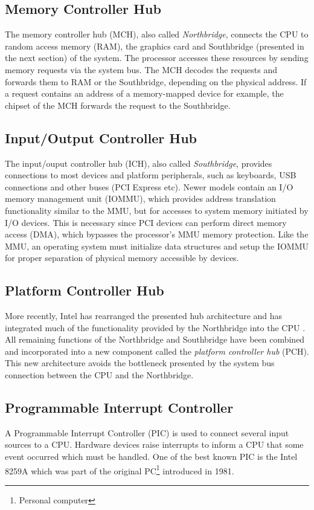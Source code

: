 \subsection{Memory Controller Hub}
The memory controller hub (MCH), also called
\emph{Northbridge}, connects the CPU to random access memory
(RAM), the graphics card and Southbridge (presented in the next section) of the
system. The processor accesses these resources by sending memory requests via
the system bus. The MCH decodes the requests and forwards them to RAM or the
Southbridge, depending on the physical address. If a request contains an address
of a memory-mapped device for example, the chipset of the MCH forwards the
request to the Southbridge.

\subsection{Input/Output Controller Hub}\label{subsec:ich}
The input/ouput controller hub (ICH), also called
\emph{Southbridge}, provides connections to most devices and
platform peripherals, such as keyboards, USB connections and other buses (PCI
Express etc). Newer models contain an I/O memory management unit
(IOMMU), which provides address translation functionality similar
to the MMU, but for accesses to system memory initiated by I/O devices.  This is
necessary since PCI devices can perform direct memory access (DMA),
which bypasses the processor's MMU memory protection.  Like the MMU, an
operating system must initialize data structures and setup the IOMMU for proper
separation of physical memory accessible by devices.

\subsection{Platform Controller Hub}
More recently, Intel has rearranged the presented hub architecture and has
integrated much of the functionality provided by the Northbridge into the CPU
\cite{IntelQPI}. All remaining functions of the Northbridge and Southbridge have
been combined and incorporated into a new component called the \emph{platform
controller hub} (PCH). This new architecture avoids the bottleneck
presented by the system bus connection between the CPU and the Northbridge.

\subsection{Programmable Interrupt Controller}\label{subsec:apic}
A Programmable Interrupt Controller (PIC) is used to connect several
input sources to a CPU. Hardware devices raise interrupts to inform a CPU that
some event occurred which must be handled. One of the best known PIC is the
Intel 8259A which was part of the original PC\footnote{Personal
computer} introduced in 1981.

